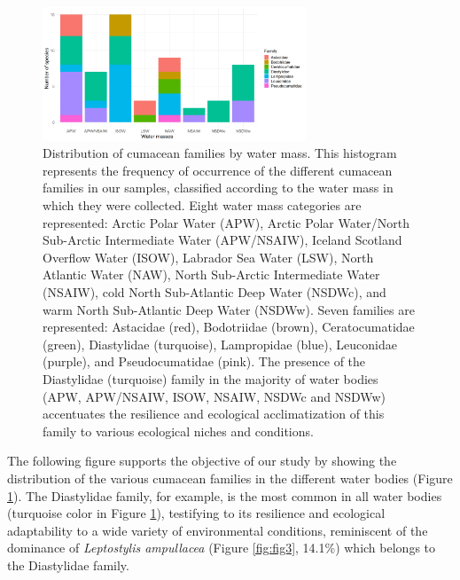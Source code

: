 \begin{figure}[htbp]
    \centering
    \includegraphics[width=0.7\textwidth]{figure3.png}
    \caption{Distribution of cumacean families by water mass. This histogram represents the frequency of occurrence of the different cumacean families in our samples, classified according to the water mass in which they were collected. Eight water mass categories are represented: Arctic Polar Water (APW), Arctic Polar Water/North Sub-Arctic Intermediate Water (APW/NSAIW), Iceland Scotland Overflow Water (ISOW), Labrador Sea Water (LSW), North Atlantic Water (NAW), North Sub-Arctic Intermediate Water (NSAIW), cold North Sub-Atlantic Deep Water (NSDWc), and warm North Sub-Atlantic Deep Water (NSDWw). Seven families are represented: Astacidae (red), Bodotriidae (brown), Ceratocumatidae (green), Diastylidae (turquoise), Lampropidae (blue), Leuconidae (purple), and Pseudocumatidae (pink). The presence of the Diastylidae (turquoise) family in the majority of water bodies (APW, APW/NSAIW, ISOW, NSAIW, NSDWc and NSDWw) accentuates the resilience and ecological acclimatization of this family to various ecological niches and conditions. \label{fig:fig4}}
\end{figure}

The following figure supports the objective of our study by showing the distribution of the various cumacean families in the different water bodies (Figure \ref{fig:fig4}). The Diastylidae family, for example, is the most common in all water bodies (turquoise color in Figure \ref{fig:fig4}), testifying to its resilience and ecological adaptability to a wide variety of environmental conditions, reminiscent of the dominance of \emph{Leptostylis ampullacea} (Figure \ref{fig:fig3}, 14.1\%) which belongs to the Diastylidae family. 

